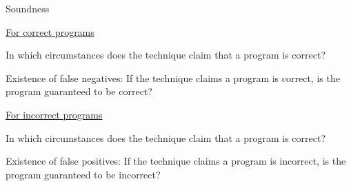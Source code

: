\documentclass[a4paper]{article}
\begin{document}
\begin{landscape}
\begin{minipage}[t]{0.2\linewidth}
\begin{betterlist}
		\item \alert{Soundness}
		\begin{betterlist}
			\item \underline{For correct programs}
			\begin{betterlist}
				\item In which circumstances does the technique claim that a program is correct?

				\item Existence of false negatives: If the technique claims a program is correct, is the program guaranteed to be correct?

			\end{betterlist}
			\item \underline{For incorrect programs}
			\begin{betterlist}
				\item In which circumstances does the technique claim that a program is correct?

				\framebox[0.95\textwidth][l]{\parbox{0.91\textwidth}{
  \begin{betterlist}
      \item TODO
  \end{betterlist}
					}}
				\item Existence of false positives: If the technique claims a program is incorrect, is the program guaranteed to be incorrect?


\end{betterlist}
\end{betterlist}
\end{betterlist}
\end{minipage}
\end{landscape}
\end{document}
